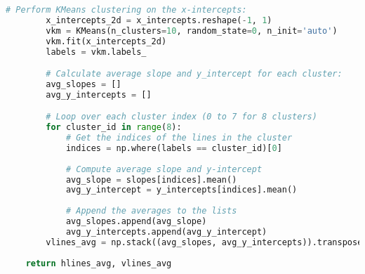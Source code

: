\documentclass{article}
\begin{document}
\begin{lstlisting}[language=Python]
        # Perform KMeans clustering on the x-intercepts:
        x_intercepts_2d = x_intercepts.reshape(-1, 1)
        vkm = KMeans(n_clusters=10, random_state=0, n_init='auto')
        vkm.fit(x_intercepts_2d)
        labels = vkm.labels_

        # Calculate average slope and y_intercept for each cluster:
        avg_slopes = []
        avg_y_intercepts = []

        # Loop over each cluster index (0 to 7 for 8 clusters)
        for cluster_id in range(8):
            # Get the indices of the lines in the cluster
            indices = np.where(labels == cluster_id)[0]
            
            # Compute average slope and y-intercept
            avg_slope = slopes[indices].mean()
            avg_y_intercept = y_intercepts[indices].mean()
            
            # Append the averages to the lists
            avg_slopes.append(avg_slope)
            avg_y_intercepts.append(avg_y_intercept)
        vlines_avg = np.stack((avg_slopes, avg_y_intercepts)).transpose(1, 0)
    
    return hlines_avg, vlines_avg
    
\end{lstlisting}
\end{document}
